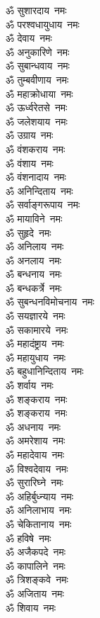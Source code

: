\begin{multicols}{2}
\begin{flushleft}
ॐ सुशारदाय~नमः\\
ॐ परश्वधायुधाय~नमः\\
ॐ देवाय~नमः\\
ॐ अनुकारिणे~नमः\\
ॐ सुबान्धवाय~नमः\\
ॐ तुम्बवीणाय~नमः\\
ॐ महाक्रोधाया~नमः\\
ॐ ऊर्ध्वरेतसे~नमः\\
ॐ जलेशयाय~नमः\\
ॐ उग्राय~नमः\hfill{}\\
ॐ वंशकराय~नमः\\
ॐ वंशाय~नमः\\
ॐ वंशनादाय~नमः\\
ॐ अनिन्दिताय~नमः\\
ॐ सर्वाङ्गरूपाय~नमः\\
ॐ मायाविने~नमः\\
ॐ सुहृदे~नमः\\
ॐ अनिलाय~नमः\\
ॐ अनलाय~नमः\\
ॐ बन्धनाय~नमः\hfill{}\\
ॐ बन्धकर्त्रे~नमः\\
ॐ सुबन्धनविमोचनाय~नमः\\
ॐ सयज्ञारये~नमः\\
ॐ सकामारये~नमः\\
ॐ महादंष्ट्राय~नमः\\
ॐ महायुधाय~नमः\\
ॐ बहुधानिन्दिताय~नमः\\
ॐ शर्वाय~नमः\\
ॐ शङ्कराय~नमः\\
ॐ शङ्कराय~नमः\hfill{}\\
ॐ अधनाय~नमः\\
ॐ अमरेशाय~नमः\\
ॐ महादेवाय~नमः\\
ॐ विश्वदेवाय~नमः\\
ॐ सुरारिघ्ने~नमः\\
ॐ अहिर्बुध्न्याय~नमः\\
ॐ अनिलाभाय~नमः\\
ॐ चेकितानाय~नमः\\
ॐ हविषे~नमः\\
ॐ अजैकपदे~नमः\hfill{}\\
ॐ कापालिने~नमः\\
ॐ त्रिशङ्कवे~नमः\\
ॐ अजिताय~नमः\\
ॐ शिवाय~नमः\\

\end{flushleft}
\end{multicols}

